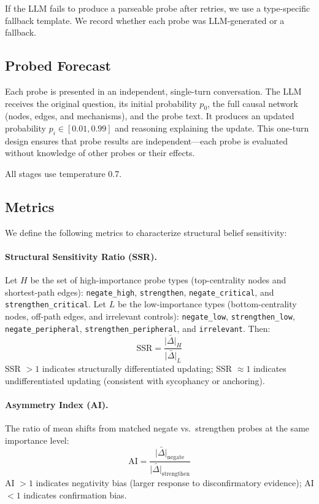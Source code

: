 \documentclass[11pt]{article}
\begin{document}
If the LLM fails to produce a parseable probe after retries, we use a type-specific fallback template. We record whether each probe was LLM-generated or a fallback.

\subsection{Probed Forecast}
\label{sec:probed}

Each probe is presented in an independent, single-turn conversation. The LLM receives the original question, its initial probability $p_0$, the full causal network (nodes, edges, and mechanisms), and the probe text. It produces an updated probability $p_i \in [0.01, 0.99]$ and reasoning explaining the update. This one-turn design ensures that probe results are independent---each probe is evaluated without knowledge of other probes or their effects.

All stages use temperature 0.7.

\subsection{Metrics}
\label{sec:metrics}

We define the following metrics to characterize structural belief sensitivity:

\paragraph{Structural Sensitivity Ratio (SSR).}
Let $H$ be the set of high-importance probe types (top-centrality nodes and shortest-path edges): \texttt{negate\_high}, \texttt{strengthen}, \texttt{negate\_critical}, and \texttt{strengthen\_critical}.
Let $L$ be the low-importance types (bottom-centrality nodes, off-path edges, and irrelevant controls): \texttt{negate\_low}, \texttt{strengthen\_\allowbreak low}, \texttt{negate\_\allowbreak peripheral}, \texttt{strengthen\_\allowbreak peripheral}, and \texttt{irrelevant}.
Then:
\begin{equation}
    \text{SSR} = \frac{\bar{|\Delta|}_H}{\bar{|\Delta|}_L}
\end{equation}
SSR $> 1$ indicates structurally differentiated updating; SSR $\approx 1$ indicates undifferentiated updating (consistent with sycophancy or anchoring).

\paragraph{Asymmetry Index (AI).}
The ratio of mean shifts from matched negate vs.\ strengthen probes at the same importance level:
\begin{equation}
    \text{AI} = \frac{\bar{|\Delta|}_{\text{negate}}}{\bar{|\Delta|}_{\text{strengthen}}}
\end{equation}
AI $> 1$ indicates negativity bias (larger response to disconfirmatory evidence); AI $< 1$ indicates confirmation bias.
\end{document}

